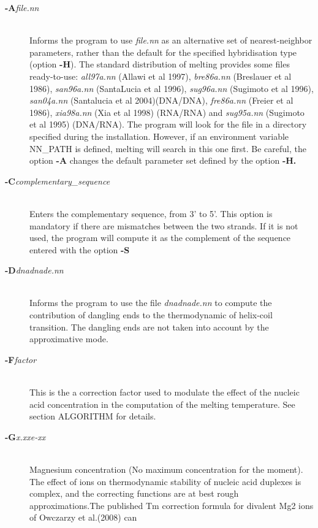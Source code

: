 \documentclass{article}
\begin{document}
\begin{description}
\item [\textbf{-A}\textit{file.nn}] \mbox{}\\
  Informs the program to use \textit{file.nn} as an alternative set of
  nearest-neighbor parameters, rather than the default for the specified
  hybridisation type (option \textbf{-H}). The standard distribution of melting
  provides some files ready-to-use: \textit{all97a.nn} (Allawi et al 1997),
  \textit{bre86a.nn} (Breslauer et al 1986), \textit{san96a.nn} (SantaLucia et
  al 1996), \textit{sug96a.nn} (Sugimoto et al 1996), \textit{san04a.nn} (Santalucia 
  et al 2004)(DNA/DNA),
  \textit{fre86a.nn} (Freier et al 1986), \textit{xia98a.nn} (Xia et al 1998)
  (RNA/RNA) and \textit{sug95a.nn} (Sugimoto et al 1995) (DNA/RNA). The program
  will look for the file in a directory specified during the installation.
  However, if an environment variable NN\_PATH is defined, melting will search
  in this one first. Be careful, the option \textbf{-A } changes the default
  parameter set defined by the option \textbf{-H.}
\item [\textbf{-C}\textit{complementary\_sequence}] \mbox{}\\
  Enters the complementary sequence, from 3' to 5'. This option is mandatory if
  there are mismatches between the two strands. If it is not used, the program
  will compute it as the complement of the sequence entered with the option
  \textbf{-S}
\item [\textbf{-D}\textit{dnadnade.nn}]\mbox{}\\
  Informs the program to use the file \textit{dnadnade.nn} to compute the
  contribution of dangling ends to the thermodynamic of helix-coil transition.
  The dangling ends are not taken into account by the approximative mode.
\item [\textbf{-F}\textit{factor}  ]\mbox{}\\
  This is the a correction factor used to modulate the effect of the nucleic
  acid concentration in the computation of the melting temperature. See section
  ALGORITHM for details.
\item [\textbf{-G}\textit{x.xxe-xx}  ]\mbox{}\\
  Magnesium  concentration  (No maximum concentration for the moment). The effect  
  of  ions  on  thermodynamic  stability  of nucleic  acid duplexes is complex,
  and the correcting functions are  at  best rough  approximations.The published 
  Tm  correction formula for divalent Mg2 ions of  Owczarzy  et al.(2008) can

\end{description}
\end{document}
